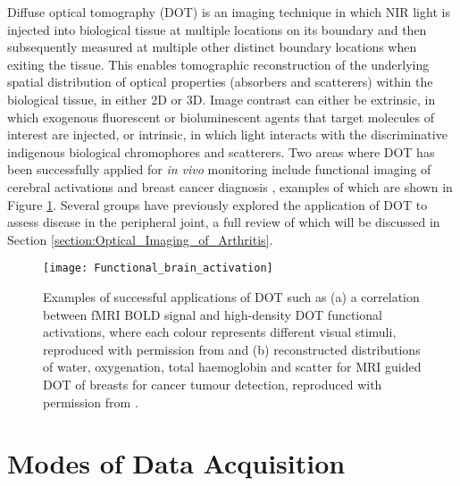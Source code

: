 \documentclass[twoside]{bhamthesis}
\theoremstyle{definition}
\begin{document}
Diffuse optical tomography (DOT) is an imaging technique in which NIR light is injected into biological tissue at multiple locations on its boundary and then subsequently measured at multiple other distinct boundary locations when exiting the tissue. This enables tomographic reconstruction of the underlying spatial distribution of optical properties (absorbers and scatterers) within the biological tissue, in either 2D or 3D. Image contrast can either be extrinsic, in which exogenous fluorescent or bioluminescent agents that target molecules of interest are injected, or intrinsic, in which light interacts with the discriminative indigenous biological chromophores and scatterers. Two areas where DOT has been successfully applied for \textit{in vivo} monitoring include functional imaging of cerebral activations \cite{boas2004diffuse,eggebrecht2012quantitative} and breast cancer diagnosis \cite{srinivasan2003interpreting,carpenter2007image}, examples of which are shown in Figure
\ref{fig:Breast_and_brain}. Several groups have previously explored the application of DOT to assess disease in the peripheral joint, a full review of which will be discussed in Section \ref{section:Optical_Imaging_of_Arthritis}.

\begin{figure}[!ht]
\centering
  \texttt{[image: Functional\_brain\_activation]}
\caption{Examples of successful applications of DOT such as (a) a correlation between fMRI BOLD signal and high-density DOT functional activations, where each colour represents different visual stimuli, reproduced with permission from \cite{eggebrecht2012quantitative} and (b) reconstructed distributions of water, oxygenation, total haemoglobin and scatter for MRI guided DOT of breasts for cancer tumour detection, reproduced with permission from \cite{carpenter2007image}.}
\label{fig:Breast_and_brain}
\end{figure}

\section{Modes of Data Acquisition}
\end{document}
